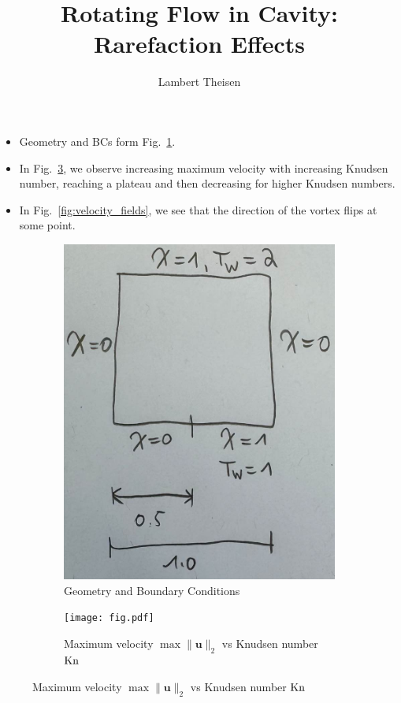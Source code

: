 \documentclass{article}
\begin{document}
\title{Rotating Flow in Cavity: Rarefaction Effects}
\author{Lambert Theisen}
\maketitle

\begin{itemize}
  \item Geometry and BCs form Fig.~\ref{fig:geometry}.
  \item In Fig.~\ref{fig:paradox}, we observe increasing maximum velocity with increasing Knudsen number, reaching a plateau and then decreasing for higher Knudsen numbers.
  \item In Fig.~\ref{fig:velocity_fields}, we see that the direction of the vortex flips at some point.
\end{itemize}

\begin{figure}[ht]
  \centering
  \begin{subfigure}{0.35\textwidth}
    \includegraphics[width=\textwidth]{sketch.jpg}
    \caption{Geometry and Boundary Conditions}\label{fig:geometry}
  \end{subfigure}
  \begin{subfigure}{0.6\textwidth}
    \texttt{[image: fig.pdf]}
    \caption{Maximum velocity \(\max \|\textbf{u}\|_2\) vs Knudsen number \(\textnormal{Kn}\)}\label{fig:paradox}
  \end{subfigure}
\end{figure}
\end{document}
